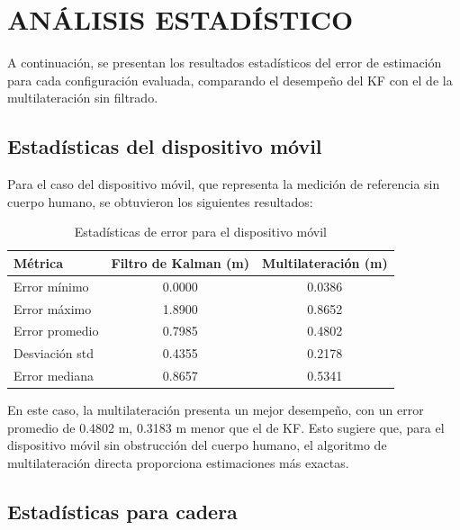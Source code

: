 \section{ANÁLISIS ESTADÍSTICO}
\label{sec:analisis_estadistico_2d}

A continuación, se presentan los resultados estadísticos del error de estimación para cada configuración evaluada, comparando el desempeño del KF con el de la multilateración sin filtrado. 

\subsection{Estadísticas del dispositivo móvil}

Para el caso del dispositivo móvil, que representa la medición de referencia sin cuerpo humano, se obtuvieron los siguientes resultados: 
%
\begin{table}[t]
\centering
\caption{Estadísticas de error para el dispositivo móvil}
\label{tab:estadisticas_tag}
\begin{tabular}{lcc}
\hline
\rowcolor{headerblue}
\textbf{Métrica} & \textbf{Filtro de Kalman (m)} & \textbf{Multilateración (m)} \\
\hline
Error mínimo & 0.0000 & 0.0386 \\
Error máximo & 1.8900 & 0.8652 \\
Error promedio & 0.7985 & 0.4802 \\
Desviación std & 0.4355 & 0.2178 \\
Error mediana & 0.8657 & 0.5341 \\
\hline
\end{tabular}
\end{table}
%
En este caso, la multilateración presenta un mejor desempeño, con un error promedio de 0.4802 m, 0.3183 m menor que el de KF. Esto sugiere que, para el dispositivo móvil sin obstrucción del cuerpo humano, el algoritmo de multilateración directa proporciona estimaciones más exactas.

\subsection{Estadísticas para cadera} 

